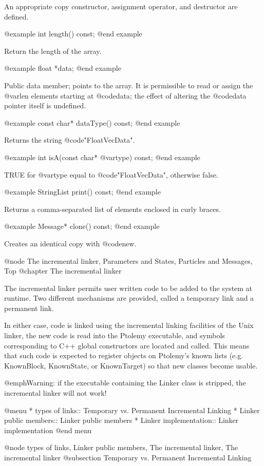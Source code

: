 An appropriate copy constructor, assignment operator, and destructor
are defined.

@example
int length() const;
@end example

Return the length of the array.

@example
float *data;
@end example

Public data member; points to the array.  It is permissible to read or
assign the @var{len} elements starting at @code{data}; the effect of
altering the @code{data} pointer itself is undefined.

@example
const char* dataType() const;
@end example

Returns the string @code{"FloatVecData"}.

@example
int isA(const char* @var{type}) const;
@end example

TRUE for @var{type} equal to @code{"FloatVecData"}, otherwise false.

@example
StringList print() const;
@end example

Returns a comma-separated list of elements enclosed in curly braces.

@example
Message* clone() const;
@end example

Creates an identical copy with @code{new}.

@node The incremental linker, Parameters and States, Particles and Messages, Top
@chapter The incremental linker

The incremental linker permits user written code to be added to the
system at runtime.  Two different mechanisms are provided, called
a temporary link and a permanent link.

In either case, code is linked using the incremental linking facilities
of the Unix linker, the new code is read into the Ptolemy executable,
and symbols corresponding to C++ global constructors are located and called.
This means that such code is expected to register objects on Ptolemy's
known lists (e.g. KnownBlock, KnownState, or KnownTarget) so that new
classes become usable.

@emph{Warning:} if the executable containing the Linker class is
stripped, the incremental linker will not work!

@menu
* types of links::              Temporary vs. Permanent Incremental Linking
* Linker public members::       Linker public members
* Linker implementation::       Linker implementation
@end menu

@node types of links, Linker public members, The incremental linker, The incremental linker
@subsection Temporary vs. Permanent Incremental Linking

